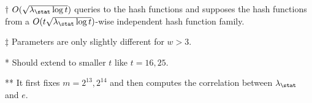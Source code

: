 \begin{table*}
\begin{threeparttable}
\begin{tabular}{cccccc}
        \bottomrule
      \end{tabular}	
      \begin{tablenotes}
        \item [$\dag$] $O(\sqrt{\lambda_\stat \log t})$ queries to the hash functions and supposes the hash functions from a $O(t\sqrt{\lambda_\stat \log t})$-wise independent hash function family. 
        \item [$\ddag$] Parameters are only slightly different for $w>3$. 
        \item [*] Should extend to smaller $t$ like $t = 16, 25$.
        \item [**]It first fixes $m = 2^{13}, 2^{14}$ and then computes the correlation between $\lambda_\stat$ and $e$.   
        \end{tablenotes}
    \end{threeparttable}
  \end{table*}
     